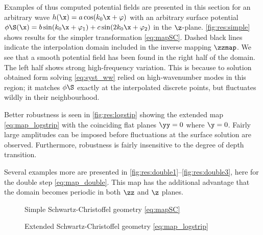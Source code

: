 Examples of thus computed potential fields are presented in this section for an arbitrary wave $h(\x) = a\cos(k_0 \x + \varphi)$ with an arbitrary surface potential $\phi\S(\x) = b\sin(k_0 \x + \varphi_1) + c\sin(2k_0 \x + \varphi_2)$ in the $\z$-plane.
\autoref{fig:res:simple} shows results for the simpler transformation \eqref{eq:mapSC}.
Dashed black lines indicate the interpolation domain included in the inverse mapping $\zzmap$.
We see that a smooth potential field has been found in the right half of the domain. 
The left half shows strong high-frequency variation. 
This is because to solution obtained form solving \eqref{eq:syst_ww} relied on high-wavenumber modes in this region; it matches $\phi\S$ exactly at the interpolated discrete points, but fluctuates wildly in their neighbourhood.

Better robustness is seen in \autoref{fig:res:logstip} showing the extended map \eqref{eq:map_logstrip} with the coinciding flat planes $\yy=0$ where $\y=0$. 
Fairly large amplitudes can be imposed before fluctuations at the surface solution are observed. 
Furthermore, robustness is fairly insensitive to the degree of depth transition.

Several examples more are presented in \autoref{fig:res:double1}--\ref{fig:res:double3}, here for the double step \eqref{eq:map_double}.
This map has the additional advantage that the domain becomes periodic in both $\zz$ and $\z$ planes.






\begin{figure}[h!ptb]%
\centering
{}%
{\vrule width 1pt}%
%
\caption{Simple Schwartz-Christoffel geometry \eqref{eq:mapSC}}%
\label{fig:res:simple}%
\end{figure}


\begin{figure}[h!ptb]%
\centering
{}%
{\vrule width 1pt}%
%
\caption{Extended Schwartz-Christoffel geometry \eqref{eq:map_logstrip}}%
\label{fig:res:logstip}%
\end{figure}

